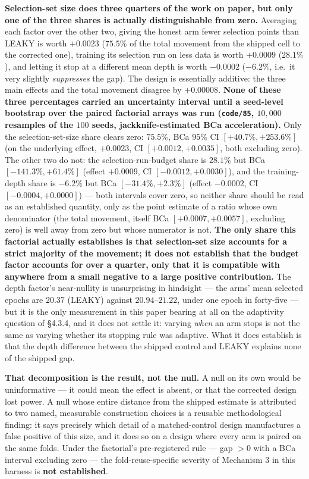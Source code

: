 \documentclass[10pt]{article} %
\begin{document}
\textbf{Selection-set size does three quarters of the work on paper, but only
one of the three shares is actually distinguishable from zero.} Averaging each
factor over the other two, giving the honest arm fewer selection points than
LEAKY is worth $+0.0023$ ($75.5\%$ of the total movement from the shipped cell
to the corrected one), training its selection run on less data is worth
$+0.0009$ ($28.1\%$), and letting it stop at a different mean depth is worth
$-0.0002$ ($-6.2\%$, i.e.\ it very slightly \emph{suppresses} the gap). The
design is essentially additive: the three main effects and the total movement
disagree by $+0.00008$. \textbf{None of these three percentages carried an
uncertainty interval until a seed-level bootstrap over the paired factorial
arrays was run (\texttt{code/85}, $10{,}000$ resamples of the $100$ seeds,
jackknife-estimated BCa acceleration).} Only the selection-set-size share
clears zero: $75.5\%$, BCa $95\%$ CI $[+40.7\%,+253.6\%]$ (on the underlying
effect, $+0.0023$, CI $[+0.0012,+0.0035]$, both excluding zero). The other two
do not: the selection-run-budget share is $28.1\%$ but BCa
$[-141.3\%,+61.4\%]$ (effect $+0.0009$, CI $[-0.0012,+0.0030]$), and the
training-depth share is $-6.2\%$ but BCa $[-31.4\%,+2.3\%]$ (effect $-0.0002$,
CI $[-0.0004,+0.0000]$) --- both intervals cover zero, so neither share should
be read as an established quantity, only as the point estimate of a ratio whose
own denominator (the total movement, itself BCa $[+0.0007,+0.0057]$, excluding
zero) is well away from zero but whose numerator is not. \textbf{The only
share this factorial actually establishes is that selection-set size accounts
for a strict majority of the movement; it does not establish that the budget
factor accounts for over a quarter, only that it is compatible with anywhere
from a small negative to a large positive contribution.} The depth factor's
near-nullity is unsurprising in hindsight --- the arms' mean selected epochs
are $20.37$ (LEAKY) against $20.94$--$21.22$, under one epoch in forty-five ---
but it is the only measurement in this paper bearing at all on the adaptivity
question of §4.3.4, and it does not settle it: varying \emph{when} an arm stops
is not the same as varying whether its stopping rule was adaptive. What it does
establish is that the depth difference between the shipped control and LEAKY
explains none of the shipped gap.

\textbf{That decomposition is the result, not the null.} A null on its own
would be uninformative --- it could mean the effect is absent, or that the
corrected design lost power. A null whose entire distance from the shipped
estimate is attributed to two named, measurable construction choices is a
reusable methodological finding: it says precisely which detail of a
matched-control design manufactures a false positive of this size, and it does
so on a design where every arm is paired on the same folds. Under the
factorial's pre-registered rule --- gap $>0$ with a BCa interval excluding zero
--- the fold-reuse-specific severity of Mechanism 3 in this harness is
\textbf{not established}.
\end{document}
